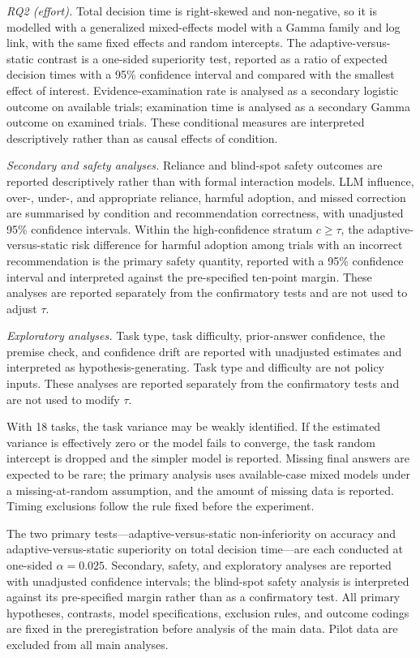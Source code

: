 \documentclass[oneside,final,14pt,a4paper]{extreport}
\begin{document}
\emph{RQ2 (effort).} Total decision time is right-skewed and non-negative, so it
is modelled with a generalized mixed-effects model with a Gamma family and log
link, with the same fixed effects and random intercepts. The adaptive-versus-
static contrast is a one-sided superiority test, reported as a ratio of expected
decision times with a 95\% confidence interval and compared with the smallest
effect of interest. Evidence-examination rate is analysed as a secondary
logistic outcome on available trials; examination time is analysed as a
secondary Gamma outcome on examined trials. These conditional measures are
interpreted descriptively rather than as causal effects of condition.

\emph{Secondary and safety analyses.} Reliance and blind-spot safety outcomes
are reported descriptively rather than with formal interaction models. LLM
influence, over-, under-, and appropriate reliance, harmful adoption, and
missed correction are summarised by condition and recommendation correctness,
with unadjusted 95\% confidence intervals. Within the high-confidence stratum
$c\geq\tau$, the adaptive-versus-static risk difference for harmful adoption
among trials with an incorrect recommendation is the primary safety quantity,
reported with a 95\% confidence interval and interpreted against the
pre-specified ten-point margin. These analyses are reported separately from the
confirmatory tests and are not used to adjust $\tau$.

\emph{Exploratory analyses.} Task type, task difficulty, prior-answer confidence,
the premise check, and confidence drift are reported with unadjusted estimates
and interpreted as hypothesis-generating. Task type and difficulty are not
policy inputs. These analyses are reported separately from the confirmatory
tests and are not used to modify $\tau$.

With 18 tasks, the task variance may be weakly identified. If the estimated
variance is effectively zero or the model fails to converge, the task random
intercept is dropped and the simpler model is reported. Missing final answers
are expected to be rare; the primary analysis uses available-case mixed models
under a missing-at-random assumption, and the amount of missing data is
reported. Timing exclusions follow the rule fixed before the experiment.

The two primary tests---adaptive-versus-static non-inferiority on accuracy and
adaptive-versus-static superiority on total decision time---are each conducted
at one-sided $\alpha=0.025$. Secondary, safety, and exploratory analyses are
reported with unadjusted confidence intervals; the blind-spot safety analysis
is interpreted against its pre-specified margin rather than as a confirmatory
test.
All primary hypotheses, contrasts, model specifications, exclusion rules, and
outcome codings are fixed in the preregistration before analysis of the main
data. Pilot data are excluded from all main analyses.
\end{document}

